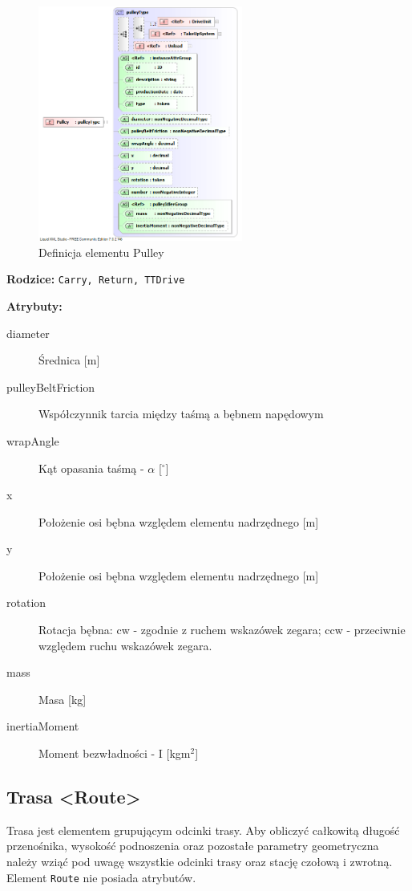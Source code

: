 \documentclass[12pt,a4paper]{article}
\begin{document}
\begin{figure}[H]
  \centering
  \includegraphics[width=0.6\textwidth]{png/liquid/Pulley}
  \caption{Definicja elementu Pulley}
  \label{fig:pulley-xsd}
\end{figure}

\noindent\textbf{Rodzice:} \texttt{Carry, Return, TTDrive}

\noindent\textbf{Atrybuty:}
\begin{description}
\item[diameter] Średnica [m]
\item[pulleyBeltFriction] Współczynnik tarcia między taśmą a bębnem napędowym
\item[wrapAngle] Kąt opasania taśmą - $\alpha$ [$^\circ$]
\item[x] Położenie osi bębna względem elementu nadrzędnego [m]
\item[y] Położenie osi bębna względem elementu nadrzędnego [m]
\item[rotation] Rotacja bębna: cw - zgodnie z ruchem wskazówek zegara;
	ccw - przeciwnie względem ruchu wskazówek zegara.
\item[mass] Masa [kg]
\item[inertiaMoment] Moment bezwładności - I [kgm$^2$]
\end{description}


\subsection{Trasa <Route>}\label{sec:Route}
Trasa jest elementem grupującym odcinki trasy. Aby obliczyć całkowitą długość
przenośnika, wysokość podnoszenia oraz pozostałe parametry geometryczna należy
wziąć pod uwagę wszystkie odcinki trasy oraz stację czołową i zwrotną.  Element
{\tt Route} nie posiada atrybutów.
\end{document}
